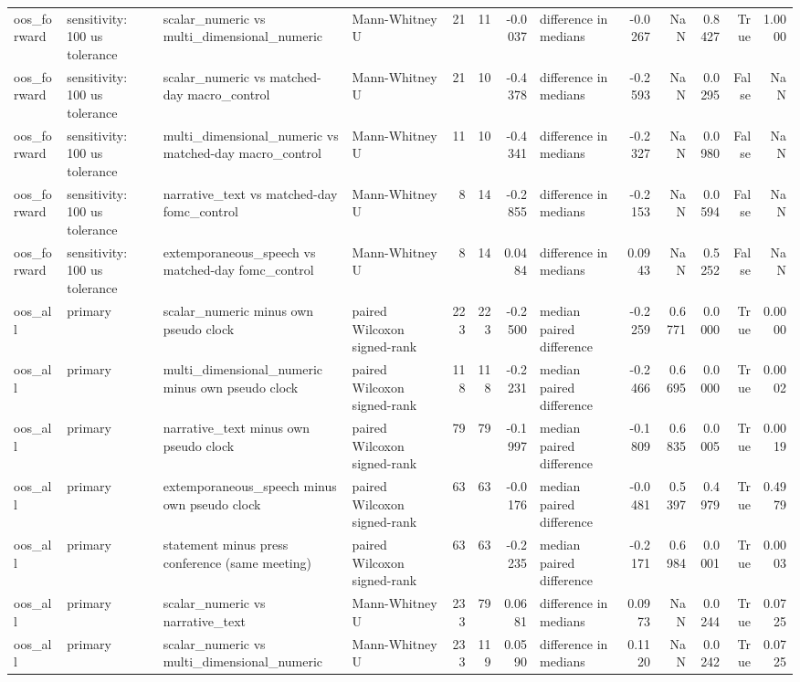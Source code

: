 \begin{tabular}{llllrrrlrrrrr}
oos_forward & sensitivity: 100 us tolerance & scalar_numeric vs multi_dimensional_numeric & Mann-Whitney U & 21 & 11 & -0.0037 & difference in medians & -0.0267 & NaN & 0.8427 & True & 1.0000 \\
oos_forward & sensitivity: 100 us tolerance & scalar_numeric vs matched-day macro_control & Mann-Whitney U & 21 & 10 & -0.4378 & difference in medians & -0.2593 & NaN & 0.0295 & False & NaN \\
oos_forward & sensitivity: 100 us tolerance & multi_dimensional_numeric vs matched-day macro_control & Mann-Whitney U & 11 & 10 & -0.4341 & difference in medians & -0.2327 & NaN & 0.0980 & False & NaN \\
oos_forward & sensitivity: 100 us tolerance & narrative_text vs matched-day fomc_control & Mann-Whitney U & 8 & 14 & -0.2855 & difference in medians & -0.2153 & NaN & 0.0594 & False & NaN \\
oos_forward & sensitivity: 100 us tolerance & extemporaneous_speech vs matched-day fomc_control & Mann-Whitney U & 8 & 14 & 0.0484 & difference in medians & 0.0943 & NaN & 0.5252 & False & NaN \\
oos_all & primary & scalar_numeric minus own pseudo clock & paired Wilcoxon signed-rank & 223 & 223 & -0.2500 & median paired difference & -0.2259 & 0.6771 & 0.0000 & True & 0.0000 \\
oos_all & primary & multi_dimensional_numeric minus own pseudo clock & paired Wilcoxon signed-rank & 118 & 118 & -0.2231 & median paired difference & -0.2466 & 0.6695 & 0.0000 & True & 0.0002 \\
oos_all & primary & narrative_text minus own pseudo clock & paired Wilcoxon signed-rank & 79 & 79 & -0.1997 & median paired difference & -0.1809 & 0.6835 & 0.0005 & True & 0.0019 \\
oos_all & primary & extemporaneous_speech minus own pseudo clock & paired Wilcoxon signed-rank & 63 & 63 & -0.0176 & median paired difference & -0.0481 & 0.5397 & 0.4979 & True & 0.4979 \\
oos_all & primary & statement minus press conference (same meeting) & paired Wilcoxon signed-rank & 63 & 63 & -0.2235 & median paired difference & -0.2171 & 0.6984 & 0.0001 & True & 0.0003 \\
oos_all & primary & scalar_numeric vs narrative_text & Mann-Whitney U & 233 & 79 & 0.0681 & difference in medians & 0.0973 & NaN & 0.0244 & True & 0.0725 \\
oos_all & primary & scalar_numeric vs multi_dimensional_numeric & Mann-Whitney U & 233 & 119 & 0.0590 & difference in medians & 0.1120 & NaN & 0.0242 & True & 0.0725 \\

\end{tabular}
